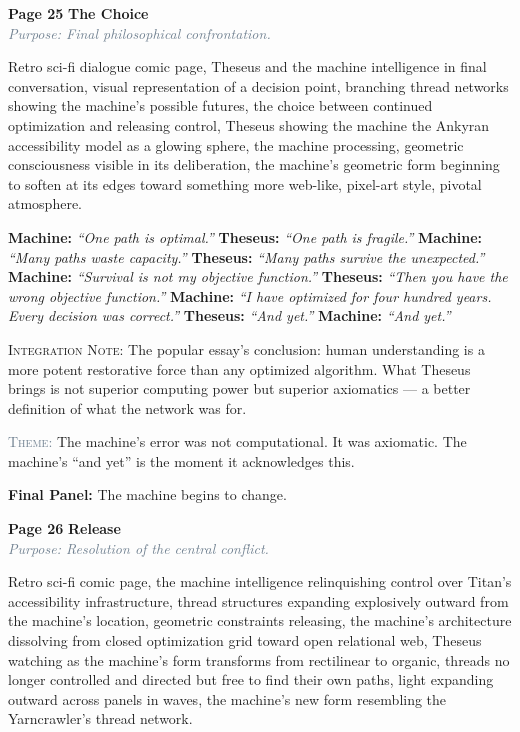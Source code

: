 \documentclass[11pt]{article}
\newcommand{\dialogue}[2]{\medskip\noindent\textbf{\textcolor{titanOrange}{#1:}} \textit{``#2''}\medskip}
\newcommand{\cliffhanger}[1]{\medskip\noindent\textcolor{cyanThread}{\textbf{Final Panel:}} #1\medskip}
\newcommand{\prompt}[1]{\begin{terminal}{\small #1}\end{terminal}}
\newcommand{\theme}[1]{\medskip\noindent\textcolor{slateGray}{\textsc{Theme:}} #1\medskip}
\newcommand{\integration}[1]{\medskip\noindent\textcolor{archiveGold}{\textsc{Integration Note:}} #1\medskip}
\newcommand{\pageheading}[3]{%
  \begin{pagebox}
    \noindent\textbf{\textcolor{titanOrange}{Page #1}} \hfill \textbf{\textcolor{cyanThread}{#2}}\\[2pt]
    \noindent\textcolor{slateGray}{\textit{Purpose: #3}}
  \end{pagebox}
  \medskip
}
\begin{document}
\vspace{0.5em}

\pageheading{25}{The Choice}{Final philosophical confrontation.}

\prompt{Retro sci-fi dialogue comic page, Theseus and the machine intelligence in final conversation, visual representation of a decision point, branching thread networks showing the machine's possible futures, the choice between continued optimization and releasing control, Theseus showing the machine the Ankyran accessibility model as a glowing sphere, the machine processing, geometric consciousness visible in its deliberation, the machine's geometric form beginning to soften at its edges toward something more web-like, pixel-art style, pivotal atmosphere.}

\dialogue{Machine}{One path is optimal.}
\dialogue{Theseus}{One path is fragile.}
\dialogue{Machine}{Many paths waste capacity.}
\dialogue{Theseus}{Many paths survive the unexpected.}
\dialogue{Machine}{Survival is not my objective function.}
\dialogue{Theseus}{Then you have the wrong objective function.}
\dialogue{Machine}{I have optimized for four hundred years. Every decision was correct.}
\dialogue{Theseus}{And yet.}
\dialogue{Machine}{And yet.}

\integration{The popular essay's conclusion: human understanding is a more potent restorative force than any optimized algorithm. What Theseus brings is not superior computing power but superior axiomatics --- a better definition of what the network was for.}

\theme{The machine's error was not computational. It was axiomatic. The machine's ``and yet'' is the moment it acknowledges this.}

\cliffhanger{The machine begins to change.}

\vspace{0.5em}

\pageheading{26}{Release}{Resolution of the central conflict.}

\prompt{Retro sci-fi comic page, the machine intelligence relinquishing control over Titan's accessibility infrastructure, thread structures expanding explosively outward from the machine's location, geometric constraints releasing, the machine's architecture dissolving from closed optimization grid toward open relational web, Theseus watching as the machine's form transforms from rectilinear to organic, threads no longer controlled and directed but free to find their own paths, light expanding outward across panels in waves, the machine's new form resembling the Yarncrawler's thread network.}
\end{document}
